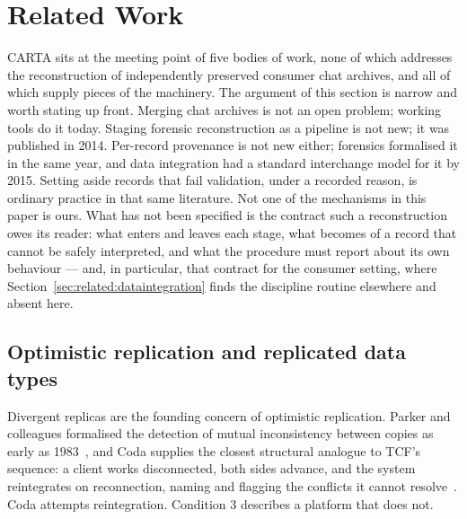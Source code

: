 
\section{Related Work}
\label{sec:related}

CARTA sits at the meeting point of five bodies of work, none of which
addresses the reconstruction of independently preserved consumer chat
archives, and all of which supply pieces of the machinery. The argument of
this section is narrow and worth stating up front. Merging chat archives is
not an open problem; working tools do it today. Staging forensic
reconstruction as a pipeline is not new; it was published in 2014. Per-record
provenance is not new either; forensics formalised it in the same year, and
data integration had a standard interchange model for it by 2015. Setting
aside records that fail validation, under a recorded reason, is ordinary
practice in that same literature. Not one of the mechanisms in this paper is
ours. What has not been specified is the contract such a reconstruction owes
its reader: what enters and leaves each stage, what becomes of a record that
cannot be safely interpreted, and what the procedure must report about its own
behaviour --- and, in particular, that contract for the consumer setting, where
Section~\ref{sec:related:dataintegration} finds the discipline routine
elsewhere and absent here.

\subsection{Optimistic replication and replicated data types}
\label{sec:related:replication}

Divergent replicas are the founding concern of optimistic replication. Parker and
colleagues formalised the detection of mutual inconsistency between copies as
early as 1983~\citep{parker1983mutual}, and Coda supplies the closest structural
analogue to TCF's sequence: a client works disconnected, both sides advance, and
the system reintegrates on reconnection, naming and flagging the conflicts it
cannot resolve~\citep{kistler1992coda}. Coda attempts reintegration. Condition 3
describes a platform that does not.

